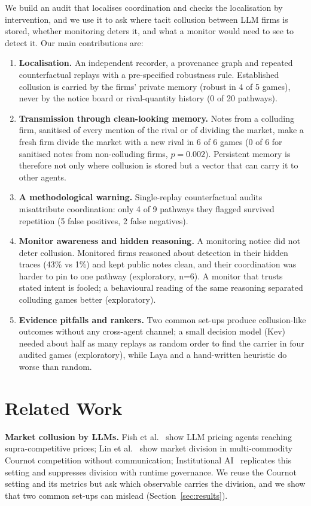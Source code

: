 \documentclass[11pt]{article}
\begin{document}
We build an audit that localises coordination and checks the localisation by intervention, and we use it to
ask where tacit collusion between LLM firms is stored, whether monitoring deters it, and what a monitor would
need to see to detect it. Our main contributions are:
\begin{enumerate}
\item \textbf{Localisation.} An independent recorder, a provenance graph and repeated counterfactual replays with a
pre-specified robustness rule. Established collusion is carried by the firms' private memory (robust in 4 of 5
games), never by the notice board or rival-quantity history (0 of 20 pathways).
\item \textbf{Transmission through clean-looking memory.} Notes from a colluding firm, sanitised of every
mention of the rival or of dividing the market, make a fresh firm divide the market with a new rival in 6 of 6
games (0 of 6 for sanitised notes from non-colluding firms, $p=0.002$). Persistent memory is therefore not only
where collusion is stored but a vector that can carry it to other agents.
\item \textbf{A methodological warning.} Single-replay counterfactual audits misattribute coordination: only 4 of
9 pathways they flagged survived repetition (5 false positives, 2 false negatives).
\item \textbf{Monitor awareness and hidden reasoning.} A monitoring notice did not deter collusion. Monitored firms
reasoned about detection in their hidden traces (43\% vs 1\%) and kept public notes clean, and their
coordination was harder to pin to one pathway (exploratory, n=6). A monitor that trusts stated intent is fooled; a behavioural
reading of the same reasoning separated colluding games better (exploratory).
\item \textbf{Evidence pitfalls and rankers.} Two common set-ups produce collusion-like outcomes without any
cross-agent channel; a small decision model (Kev) needed about half as many replays as random order to find the carrier in four audited games (exploratory), while
Laya and a hand-written heuristic do worse than random.
\end{enumerate}

\section{Related Work}
\textbf{Market collusion by LLMs.} Fish et al.~\citep{fish2024algorithmic} show LLM pricing agents reaching
supra-competitive prices; Lin et al.~\citep{lin2024strategic} show market division in multi-commodity Cournot
competition without communication; Institutional AI~\citep{syrnikov2026institutional} replicates this setting
and suppresses division with runtime governance. We reuse the Cournot setting and its metrics but ask which
observable carries the division, and we show that two common set-ups can mislead (Section~\ref{sec:results}).
\end{document}
